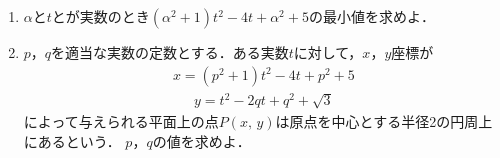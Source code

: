 \documentclass[../../main.tex]{subfiles}
\begin{document}
\begin{enumerate}
  \item $\alpha$と$t$とが実数のとき$(\alpha^2+1)t^2-4t+\alpha^2+5$の最小値を求めよ．
  \item $p$，$q$を適当な実数の定数とする．ある実数$t$に対して，$x$，$y$座標が
    \begin{align}
      x=(p^2+1)t^2-4t+p^2+5
    \end{align}
    \begin{align}
      y=t^2-2qt+q^2+\sqrt{3}
    \end{align}
    によって与えられる平面上の点$P(x, \, y)$は原点を中心とする半径2の円周上にあるという．
    $p$，$q$の値を求めよ．
\end{enumerate}
\end{document}
